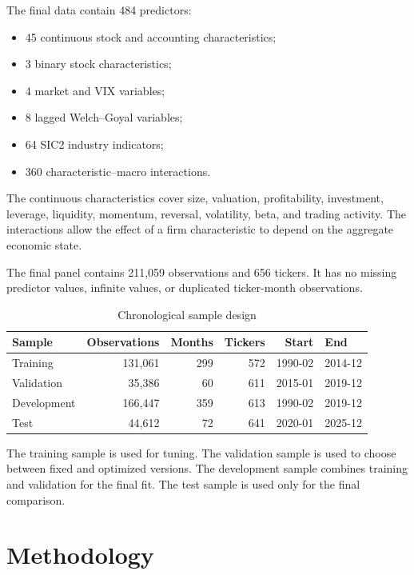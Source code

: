 \documentclass[11pt,a4paper]{article}
\begin{document}
The final data contain 484 predictors:

\begin{itemize}
  \item 45 continuous stock and accounting characteristics;
  \item 3 binary stock characteristics;
  \item 4 market and VIX variables;
  \item 8 lagged Welch--Goyal variables;
  \item 64 SIC2 industry indicators;
  \item 360 characteristic--macro interactions.
\end{itemize}

The continuous characteristics cover size, valuation, profitability,
investment, leverage, liquidity, momentum, reversal, volatility, beta, and
trading activity. The interactions allow the effect of a firm characteristic
to depend on the aggregate economic state.

The final panel contains 211,059 observations and 656 tickers. It has no missing
predictor values, infinite values, or duplicated ticker-month observations.

\begin{table}[H]
\centering
\caption{Chronological sample design}
\label{tab:sample-splits}
\small
\begin{tabular}{lrrrrl}
\toprule
Sample & Observations & Months & Tickers & Start & End \\
\midrule
Training    & 131,061 & 299 & 572 & 1990-02 & 2014-12 \\
Validation  &  35,386 &  60 & 611 & 2015-01 & 2019-12 \\
Development & 166,447 & 359 & 613 & 1990-02 & 2019-12 \\
Test        &  44,612 &  72 & 641 & 2020-01 & 2025-12 \\
\bottomrule
\end{tabular}
\end{table}

The training sample is used for tuning. The validation sample is used to choose
between fixed and optimized versions. The development sample combines training
and validation for the final fit. The test sample is used only for the final
comparison.


\section{Methodology}
\label{sec:methodology}
\end{document}
